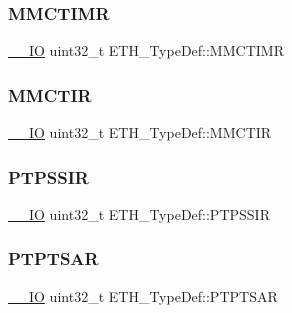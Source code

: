 \mbox{\label{struct_e_t_h___type_def_acbe0f472d72f011c5903806d12c4e086}} 
\subsubsection{\texorpdfstring{MMCTIMR}{MMCTIMR}}
{\footnotesize\ttfamily \mbox{\hyperlink{group___c_m_s_i_s___c_m3__core__definitions_gaec43007d9998a0a0e01faede4133d6be}{\+\_\+\+\_\+\+IO}} uint32\+\_\+t E\+T\+H\+\_\+\+Type\+Def\+::\+M\+M\+C\+T\+I\+MR}

\mbox{\label{struct_e_t_h___type_def_aa417b3dbd6f2bd86562b6a09f51d97ac}} 
\subsubsection{\texorpdfstring{MMCTIR}{MMCTIR}}
{\footnotesize\ttfamily \mbox{\hyperlink{group___c_m_s_i_s___c_m3__core__definitions_gaec43007d9998a0a0e01faede4133d6be}{\+\_\+\+\_\+\+IO}} uint32\+\_\+t E\+T\+H\+\_\+\+Type\+Def\+::\+M\+M\+C\+T\+IR}

\mbox{\label{struct_e_t_h___type_def_ae4f81e69555bf3deef2f1404752861ad}} 
\subsubsection{\texorpdfstring{PTPSSIR}{PTPSSIR}}
{\footnotesize\ttfamily \mbox{\hyperlink{group___c_m_s_i_s___c_m3__core__definitions_gaec43007d9998a0a0e01faede4133d6be}{\+\_\+\+\_\+\+IO}} uint32\+\_\+t E\+T\+H\+\_\+\+Type\+Def\+::\+P\+T\+P\+S\+S\+IR}

\mbox{\label{struct_e_t_h___type_def_aa10f988327487d24260f0af1890273b2}} 
\subsubsection{\texorpdfstring{PTPTSAR}{PTPTSAR}}
{\footnotesize\ttfamily \mbox{\hyperlink{group___c_m_s_i_s___c_m3__core__definitions_gaec43007d9998a0a0e01faede4133d6be}{\+\_\+\+\_\+\+IO}} uint32\+\_\+t E\+T\+H\+\_\+\+Type\+Def\+::\+P\+T\+P\+T\+S\+AR}

